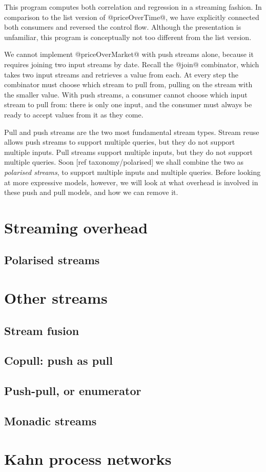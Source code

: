 This program computes both correlation and regression in a streaming fashion.
In comparison to the list version of @priceOverTime@, we have explicitly connected both consumers and reversed the control flow.
Although the presentation is unfamiliar, this program is conceptually not too different from the list version.

We cannot implement @priceOverMarket@ with push streams alone, because it requires joining two input streams by date.
Recall the @join@ combinator, which takes two input streams and retrieves a value from each.
At every step the combinator must choose which stream to pull from, pulling on the stream with the smaller value.
With push streams, a consumer cannot choose which input stream to pull from: there is only one input, and the consumer must always be ready to accept values from it as they come.

Pull and push streams are the two most fundamental stream types.
Stream reuse allows push streams to support multiple queries, but they do not support multiple inputs.
Pull streams support multiple inputs, but they do not support multiple queries.
Soon [ref taxonomy/polarised] we shall combine the two as \emph{polarised streams}, to support multiple inputs and multiple queries.
Before looking at more expressive models, however, we will look at what overhead is involved in these push and pull models, and how we can remove it.

\section{Streaming overhead}



\subsection{Polarised streams}

\section{Other streams}
\subsection{Stream fusion}
\subsection{Copull: push as pull}
\subsection{Push-pull, or enumerator}
\subsection{Monadic streams}

\section{Kahn process networks}

